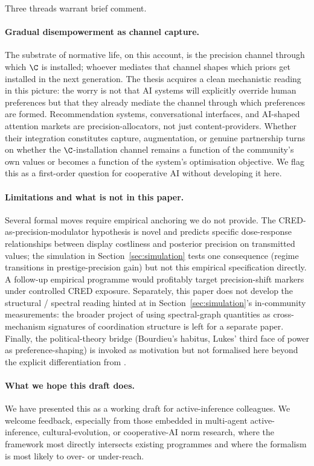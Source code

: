\documentclass[11pt,a4paper]{article}
\begin{document}
Three threads warrant brief comment.

\paragraph{Gradual disempowerment as channel capture.}
The substrate of normative life, on this account, is the precision channel
through which $\C$ is installed; whoever mediates that channel shapes which
priors get installed in the next generation. The
\citet{kulveit2025GradualDisempowerment} thesis acquires a clean mechanistic
reading in this picture: the worry is not that AI systems will explicitly
override human preferences but that they already mediate the channel through
which preferences are formed. Recommendation systems, conversational
interfaces, and AI-shaped attention markets are precision-allocators, not
just content-providers. Whether their integration constitutes capture,
augmentation, or genuine partnership turns on whether the
$\C$-installation channel remains a function of the community's own values
or becomes a function of the system's optimisation objective. We flag this
as a first-order question for cooperative AI without developing it here.

\paragraph{Limitations and what is not in this paper.}
Several formal moves require empirical anchoring we do not provide. The
CRED-as-precision-modulator hypothesis is novel and predicts specific
dose-response relationships between display costliness and posterior
precision on transmitted values; the simulation in
Section~\ref{sec:simulation} tests one consequence (regime transitions in
prestige-precision gain) but not this empirical specification directly. A
follow-up empirical programme would profitably target precision-shift
markers under controlled CRED exposure. Separately, this paper does not
develop the structural / spectral reading hinted at in
Section~\ref{sec:simulation}'s in-community measurements: the broader
project of using spectral-graph quantities as cross-mechanism signatures
of coordination structure is left for a separate paper. Finally, the
political-theory bridge (Bourdieu's habitus, Lukes' third face of power as
preference-shaping) is invoked as motivation but not formalised here beyond
the explicit differentiation from \citet{albarracin2025SocialPower}.

\paragraph{What we hope this draft does.}
We have presented this as a working draft for active-inference colleagues.
We welcome feedback, especially from those embedded in multi-agent
active-inference, cultural-evolution, or cooperative-AI norm research,
where the framework most directly intersects existing programmes and where
the formalism is most likely to over- or under-reach.



\end{document}
